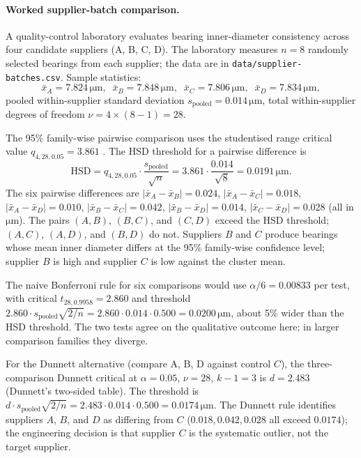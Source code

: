 \paragraph{Worked supplier-batch comparison.} A quality-control
laboratory evaluates bearing inner-diameter consistency across four
candidate suppliers (A, B, C, D). The laboratory measures $n = 8$
randomly selected bearings from each supplier; the data are in
\texttt{data/supplier-batches.csv}. Sample statistics:
\[
\bar{x}_{A} = 7.824\,\si{\micro\meter}, \;\;
\bar{x}_{B} = 7.848\,\si{\micro\meter}, \;\;
\bar{x}_{C} = 7.806\,\si{\micro\meter}, \;\;
\bar{x}_{D} = 7.834\,\si{\micro\meter},
\]
pooled within-supplier standard deviation $s_{\text{pooled}} = 0.014
\,\si{\micro\meter}$, total within-supplier degrees of freedom
$\nu = 4 \times (8 - 1) = 28$.

The 95\% family-wise pairwise comparison uses the studentised
range critical value $q_{4, 28, 0.05} = 3.861$
\cite{text:ch04t3-montgomery-cir-2020}. The HSD threshold for a
pairwise difference is
\[
\text{HSD} = q_{4, 28, 0.05} \cdot \frac{s_{\text{pooled}}}{\sqrt{n}}
= 3.861 \cdot \frac{0.014}{\sqrt{8}} = 0.0191\,\si{\micro\meter}.
\]
The six pairwise differences are $|\bar{x}_{A} - \bar{x}_{B}| =
0.024$, $|\bar{x}_{A} - \bar{x}_{C}| = 0.018$, $|\bar{x}_{A} -
\bar{x}_{D}| = 0.010$, $|\bar{x}_{B} - \bar{x}_{C}| = 0.042$,
$|\bar{x}_{B} - \bar{x}_{D}| = 0.014$, $|\bar{x}_{C} - \bar{x}_{D}|
= 0.028$ (all in $\si{\micro\meter}$). The pairs $(A, B)$,
$(B, C)$, and $(C, D)$ exceed the HSD threshold; $(A, C)$,
$(A, D)$, and $(B, D)$ do not. Suppliers $B$ and $C$ produce
bearings whose mean inner diameter differs at the 95\% family-wise
confidence level; supplier $B$ is high and supplier $C$ is low
against the cluster mean.

The naive Bonferroni rule for six comparisons would use
$\alpha/6 = 0.00833$ per test, with critical $t_{28, 0.9958} =
2.860$ and threshold
$2.860 \cdot s_{\text{pooled}} \sqrt{2/n} = 2.860 \cdot 0.014 \cdot
0.500 = 0.0200\,\si{\micro\meter}$, about 5\% wider than the HSD
threshold. The two tests agree on the qualitative outcome here; in
larger comparison families they diverge.

For the Dunnett alternative (compare A, B, D against control $C$),
the three-comparison Dunnett critical at $\alpha = 0.05$, $\nu = 28$,
$k - 1 = 3$ is $d = 2.483$ (Dunnett's two-sided table). The
threshold is $d \cdot s_{\text{pooled}} \sqrt{2/n} = 2.483 \cdot
0.014 \cdot 0.500 = 0.0174\,\si{\micro\meter}$. The Dunnett rule
identifies suppliers $A$, $B$, and $D$ as differing from $C$
($0.018, 0.042, 0.028$ all exceed $0.0174$); the engineering
decision is that supplier $C$ is the systematic outlier, not the
target supplier.

